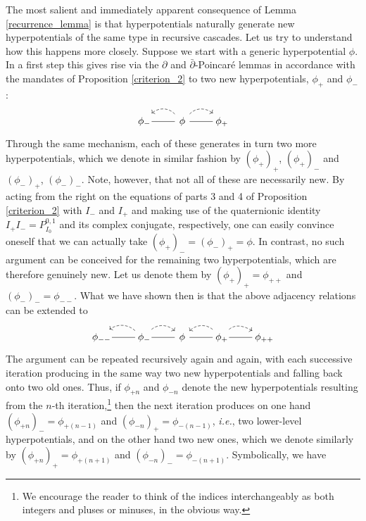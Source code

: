 \documentclass[11pt]{amsart}
\theoremstyle{remark}
\theoremstyle{remark}
\theoremstyle{definition}
\theoremstyle{definition}
\theoremstyle{definition}
\newcommand{\0}{{\scriptstyle 0'}} %
\newcommand{\1}{{\scriptstyle 1'}}
\newcommand{\pt}{\hspace{1pt}} %
\newcommand{\hp}{\hspace{0.5pt}} %
\newcommand{\noarrow}{\mathord{\begin{tikzpicture}[baseline=-0.03ex, line width=0.3, scale=0.1]
\draw (0,1) -- (9.54,1);
\end{tikzpicture}}}
\begin{document}
The most salient and immediately apparent consequence of Lemma \ref{recurrence_lemma} is that hyperpotentials naturally generate new hyperpotentials of the same type in recursive cascades. Let us try to understand how this happens more closely. Suppose we start with a generic hyperpotential $\phi$. In a first step this gives rise via the $\partial$ and \mbox{$\bar{\partial}$\pt-\hp Poincar\'e} lemmas in accordance with the mandates of Proposition \ref{criterion_2} to two new hyperpotentials, $\phi_+$ and $\phi_-$:
\begin{equation*}
\begin{tikzcd}
\phi_{-} \!\! \arrow[dash]{r}  &  \arrow[l, dashed, bend right=45, in=222] \phi  \arrow[r, dashed, bend left=45, in=140] \arrow[dash]{r} & \! \phi_{+}
\end{tikzcd}
\end{equation*}
Through the same mechanism, each of these generates in turn two more hyperpotentials, which we denote in similar fashion by $(\phi_+)_+$, $(\phi_+)_-$ and $(\phi_-)_+$, $(\phi_-)_-$. Note, however, that not all of these are necessarily new. By acting from the right on the equations of parts 3 and 4 of Proposition \ref{criterion_2} with $I_-$ and $I_+$ and making use of the quaternionic identity $I_+I_- = P^{0,1}_{\scriptscriptstyle I_0}$ and its complex conjugate, respectively, one can easily convince oneself that we can actually take $(\phi_+)_- = (\phi_-)_+ = \phi$. In contrast, no such argument can be conceived for the remaining two hyperpotentials, which are therefore genuinely new. Let us denote them by $(\phi_+)_+ = \phi_{++}$ and $(\phi_-)_- = \phi_{--}$. What we have shown then is that the above adjacency relations can be extended to
\begin{equation*}
\begin{tikzcd}
\phi_{--} \!\! \arrow[dash]{r} & \arrow[l, dashed, bend right=40] \! \phi_{-} \!\!  \arrow[r, dashed, bend left=45, in=138] \arrow[dash]{r}  & \phi  \arrow[dash]{r} & \arrow[l, dashed, bend right=45, in=222] \! \phi_{+} \!\! \arrow[r, dashed, bend left=45, in =152] \arrow[dash]{r} & \! \phi_{++}
\end{tikzcd}
\end{equation*}
The argument can be repeated recursively again and again, with each successive iteration producing in the same way two new hyperpotentials and falling back onto two old ones. Thus, if $\phi_{+n}$ and $\phi_{-n}$ denote the new hyperpotentials resulting from the $n$-th iteration,\footnote{\pt We encourage the reader to think of the indices interchangeably as both integers and pluses or minuses, in the obvious way.} then the next iteration produces on one hand $(\phi_{+n})_- = \phi_{+(n-1)}$ and $(\phi_{-n})_+ = \phi_{-(n-1)}$, \textit{i.e.}, two lower-level hyperpotentials, and on the other hand two new ones, which we denote similarly by $(\phi_{+n})_+ = \phi_{+(n+1)}$ and $(\phi_{-n})_- = \phi_{-(n+1)}$. Symbolically, we have
\end{document}
